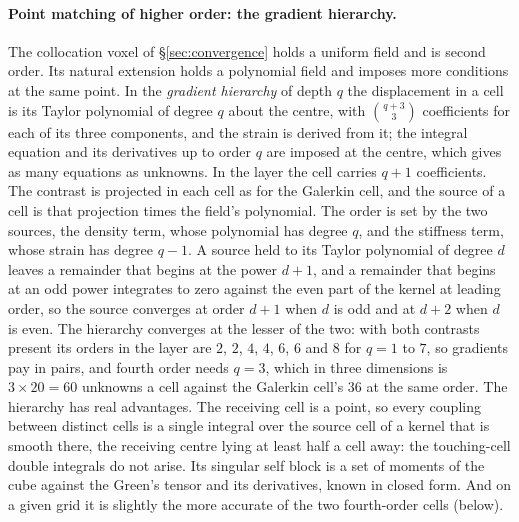 \documentclass[11pt,a4paper]{article}
\begin{document}
\paragraph{Point matching of higher order: the gradient hierarchy.} The collocation voxel of
\S\ref{sec:convergence} holds a uniform field and is second order. Its natural extension holds a
polynomial field and imposes more conditions at the same point. In the \emph{gradient hierarchy} of
depth $q$ the displacement in a cell is its Taylor polynomial of degree $q$ about the centre, with
$\binom{q+3}{3}$ coefficients for each of its three components, and the strain is derived from it; the
integral equation and its derivatives up to order $q$ are imposed at the centre, which gives as many
equations as unknowns. In the layer the cell carries $q+1$ coefficients. The contrast is projected in
each cell as for the Galerkin cell, and the source of a cell is that projection times the field's
polynomial. The order is set by the two sources, the density term, whose polynomial has degree $q$, and
the stiffness term, whose strain has degree $q-1$. A source held to its Taylor polynomial of degree $d$
leaves a remainder that begins at the power $d+1$, and a remainder that begins at an odd power
integrates to zero against the even part of the kernel at leading order, so the source converges at
order $d+1$ when $d$ is odd and at $d+2$ when $d$ is even. The hierarchy converges at the lesser of the
two: with both contrasts present its orders in the layer are $2$, $2$, $4$, $4$, $6$, $6$ and $8$ for
$q=1$ to $7$, so gradients pay in pairs, and fourth order needs $q=3$, which in three dimensions is
$3\times20=60$ unknowns a cell against the Galerkin cell's $36$ at the same order. The hierarchy has
real advantages. The receiving cell is a point, so every coupling between distinct cells is a single
integral over the source cell of a kernel that is smooth there, the receiving centre lying at least half
a cell away: the touching-cell double integrals do not arise. Its singular self block is a set of
moments of the cube against the Green's tensor and its derivatives, known in closed form. And on a
given grid it is slightly the more accurate of the two fourth-order cells (below).
\end{document}
